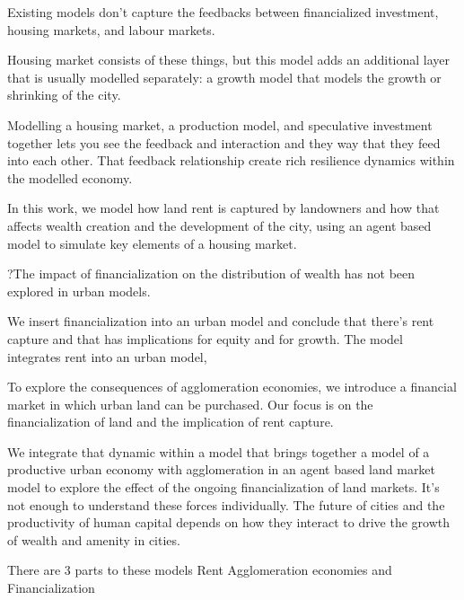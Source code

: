 
Existing models don't capture the feedbacks between financialized investment, housing markets, and labour markets. 

Housing market consists of these things, but this model adds an additional layer that is usually modelled separately: a growth model that models the growth or shrinking of the city. 

Modelling a housing market, a production model, and speculative investment together lets you see the feedback and interaction and they way that they feed into each other. That feedback relationship create rich resilience dynamics within the modelled economy. 

In this work, we model how land rent is captured by landowners and how that affects wealth creation and the development of the city, using an agent based model to simulate key elements of a housing market. 

?The impact of financialization on the distribution of wealth has not been explored in urban models.

We insert financialization into an urban model and conclude that there's rent capture and that has implications for equity and for growth. 
The model integrates rent into an urban model, 

To explore the consequences of agglomeration economies, we introduce a financial market in which urban land can be purchased. 
Our focus is on the financialization of land and the implication of rent capture.


We integrate that dynamic within a model that brings together a model of a productive urban economy with agglomeration in an agent based land market model to explore the effect of %
the ongoing financialization of land markets. 
It's not enough to understand these forces individually.
The future of cities and the productivity of human capital depends on how they interact to drive the growth of wealth and amenity in cities. 

There are 3 parts to these models
Rent
Agglomeration economies and 
Financialization




